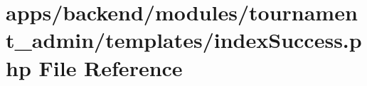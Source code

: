 \hypertarget{backend_2modules_2tournament__admin_2templates_2index_success_8php}{\section{apps/backend/modules/tournament\-\_\-admin/templates/index\-Success.php File Reference}
\label{backend_2modules_2tournament__admin_2templates_2index_success_8php}
}
